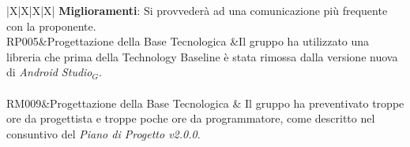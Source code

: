 \begin{tabularx}{\textwidth}{|X|X|X|X|}
{ 	\textbf{Miglioramenti}: Si provvederà ad una comunicazione più frequente con la proponente.}\\
     	\hline
     	    RP005&Progettazione della Base Tecnologica  &Il gruppo ha utilizzato una libreria che prima della Technology Baseline è stata rimossa dalla versione nuova di \textit{Android Studio$_{G}$}.\\
     	\hline
     	\\
     	     	\hline
     	RM009&Progettazione della Base Tecnologica & Il gruppo ha preventivato troppe ore da progettista e troppe poche ore da programmatore, come descritto nel consuntivo del \textit{Piano di Progetto v2.0.0}.\\
     	\hline
     	\\
     	\hline
 	\caption{Attualizzazione dell'analisi dei rischi}
\end{tabularx}